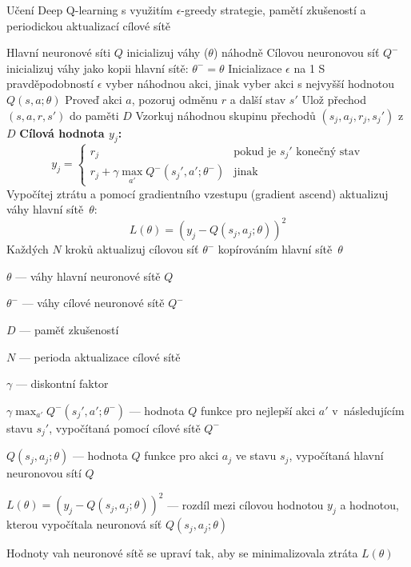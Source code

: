\begin{algorithm}[H]
  \caption{Učení Deep Q-learning s využitím $\epsilon$-greedy strategie, pamětí zkušeností a periodickou aktualizací cílové sítě}
  \begin{algorithmic}[1]
    \State Hlavní neuronové síti $Q$ inicializuj váhy ($\theta$) náhodně
    \State Cílovou neuronovou síť $Q^{-}$ inicializuj váhy jako kopii hlavní sítě: $\theta^{-} = \theta$
    \State Inicializace $\epsilon$ na 1
            \State S pravděpodobností $\epsilon$ vyber náhodnou akci, jinak vyber akci s nejvyšší hodnotou $Q(s, a; \theta)$
            \State Proveď akci $a$, pozoruj odměnu $r$ a další stav $s'$
            \State Ulož přechod $(s, a, r, s')$ do paměti $D$
              \State Vzorkuj náhodnou skupinu přechodů $(s_j, a_j, r_j, s_j')$ z $D$
                  \State \textbf{Cílová hodnota $y_j$:}
                  \[
                  y_j = 
                  \begin{cases} 
                  r_j & \text{pokud je } s_j' \text{ konečný stav} \\
                  r_j + \gamma \max_{a'} Q^{-}(s_j', a'; \theta^{-}) & \text{jinak}
                  \end{cases}
                  \]
                  \State Vypočítej ztrátu a pomocí gradientního vzestupu (gradient ascend) aktualizuj váhy hlavní sítě~$\theta$:
                   \[
                  L(\theta) = \left(y_j - Q(s_j, a_j; \theta)\right)^2
                  \]
              \EndFor
            \EndIf
            \State Každých $N$ kroků aktualizuj cílovou síť $\theta^{-}$ kopírováním hlavní sítě~$\theta$
      \EndFor
    \EndFor
  \end{algorithmic}
\end{algorithm}
\begin{myitemize}
  \item \(\theta\) --- váhy hlavní neuronové sítě \(Q\)
  \item \(\theta^{-}\) --- váhy cílové neuronové sítě \(Q^{-}\)
  \item $D$ --- paměť zkušeností
  \item $N$ --- perioda aktualizace cílové sítě
  \item $\gamma$ --- diskontní faktor
  \item $\gamma \max_{a'} Q^{-}(s_j', a'; \theta^{-})$ --- hodnota $Q$ funkce pro nejlepší akci $a'$ v~následujícím stavu $s_j'$, vypočítaná pomocí cílové sítě $Q^{-}$
  \item $Q(s_j, a_j; \theta)$ --- hodnota $Q$ funkce pro akci $a_j$ ve stavu $s_j$, vypočítaná hlavní neuronovou sítí $Q$
  \item $L(\theta) = \left(y_j - Q(s_j, a_j; \theta)\right)^2$ --- rozdíl mezi cílovou hodnotou $y_j$ a hodnotou, kterou vypočítala neuronová síť $Q(s_j, a_j; \theta)$
  \item Hodnoty vah neuronové sítě se upraví tak, aby se minimalizovala ztráta $L(\theta)$
\end{myitemize}
